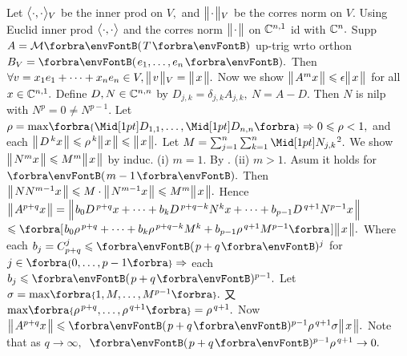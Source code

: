 Let $\big\langle{}\cdot,\cdot{}\big\rangle{_V}$ be the inner prod on $V,$ and $\big\Vert\hspace{1pt}{}{\cdot}{}\hspace{1pt}\big\Vert{_V}$ be the corres norm on $V.$\parSol{}
Using Euclid inner prod $\big\langle{}\cdot,\cdot{}\big\rangle$ and the corres norm $\big\Vert\hspace{1pt}{}{\cdot}{}\hspace{1pt}\big\Vert$ on ${\mathbb{C}}^{n,1}$ id with ${\mathbb{C}}^n.$\parSol{}
Supp $A=\Mt{T}$ up-trig wrto orthon $B_V=\Par{e_1,\dots,e_n}.$\parSol{}
Then $\forall v=x_1e_1+\dots+x_ne_n\in V,\big\Vert\hspace{1pt}{}v{}\hspace{1pt}\big\Vert{_V}=\big\Vert\hspace{1pt}{}x{}\hspace{1pt}\big\Vert.$ Now we show $\big\Vert\hspace{1pt}{}A^mx{}\hspace{1pt}\big\Vert\leqslant\epsilon\big\Vert\hspace{1pt}{}x{}\hspace{1pt}\big\Vert$ for all $x\in{\mathbb{C}}^{n,1}.$\parSol{}
Define $D,N\in{\mathbb{C}}^{n,n}$ by $D_{j,k}=\delta_{j,k}A_{j,k},\:N=A-D.$ Then $N$ is nilp with $N^p=0\neq N^{p-1}.$\parSol{}
Let $\rho=\max\!\Bra{\aMid{D_{1,1}},\dots,\aMid{D_{n,n}}}\Rightarrow0\leqslant\rho<1,$ and each $\big\Vert\hspace{1pt}{}D^{\,k}x{}\hspace{1pt}\big\Vert\leqslant\rho^{\,k}\big\Vert\hspace{1pt}{}x{}\hspace{1pt}\big\Vert\leqslant\big\Vert\hspace{1pt}{}x{}\hspace{1pt}\big\Vert.$\vspace{1pt}\parSol{}
Let $M=\sum_{j=1}^n\sum_{k=1}^n\aMidsq{N_{j,k}}.$ We show $\big\Vert\hspace{1pt}{}N^mx{}\hspace{1pt}\big\Vert\leqslant M^m\big\Vert\hspace{1pt}{}x{}\hspace{1pt}\big\Vert$ by induc. (i) $m=1.$ By .\vspace{1pt}\parSol{}
(ii) $m>1.$ Asum it holds for $\Par{m-1}.$ Then $\big\Vert\hspace{1pt}{}NN^{m-1}x{}\hspace{1pt}\big\Vert\leqslant M\cdot\big\Vert\hspace{1pt}{}N^{m-1}x{}\hspace{1pt}\big\Vert\leqslant M^m\big\Vert\hspace{1pt}{}x{}\hspace{1pt}\big\Vert.$\vspace{3pt}\parSol{}
Hence $\big\Vert\hspace{1pt}{}A^{p+q}x{}\hspace{1pt}\big\Vert=\Big\Vert\hspace{1pt}{}b_0D^{\,p+q}x+\dots+b_kD^{\,p+q-k}N^{k}x+\dots+b_{p-1}D^{\,q+1}N^{p-1}x{}\hspace{1pt}\Big\Vert$\vspace{3pt}\parSol{}
$\leqslant\BigSbra{{b_0\rho^{\,p+q}+\dots+b_k\rho^{\,p+q-k}M^k+b_{p-1}\rho^{\,q+1}M^{p-1}}}\Dvert{x}.$\vspace{2pt}\parSol{}
Where each $b_j=\mathC_{p+q}^j\leqslant\Par{p+q}{^j}$ for $j\in\Bra{0,\dots,p-1}\Rightarrow$ each $b_j\leqslant\Par{p+q}{^{p-1}}.$\vspace{1pt}\parSol{}
Let $\sigma=\max\!\Bra{1,M,\dots,M^{p-1}}.$ 又 $\max\!\Bra{\rho^{\,p+q},\dots,\rho^{\,q+1}}=\rho^{\,q+1}.$\parSol{}
Now $\Dvert{A^{p+q}x}\leqslant\Par{p+q}{^{p-1}}\rho^{\,q+1}\sigma\Dvert{x}.$ \;Note that as $q\rightarrow\infty,$ \,$\Par{p+q}{^{p-1}}\rho^{\,q+1}\rightarrow0.$\PfEnd
\SepLine
\ChEnd

\pagebreak


\vspace{4pt}

